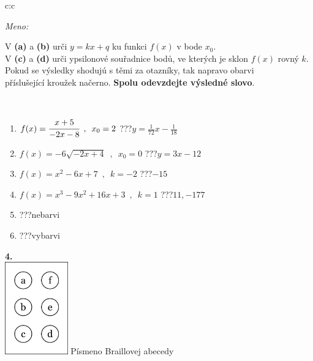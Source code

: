 \documentclass[10pt]{report}
\begin{document}
\begin{tabular}{c:c}
\begin{minipage}[c][104.5mm][t]{0.5\linewidth}
\begin{center}
\textit{Meno:}\phantom{xxxxxxxxxxxxxxxxxxxxxxxxxxxxxxxxxxxxxxxxxxxxxxxxxxxxxxxxxxxxxxxxx}\\[5mm]
\begin{minipage}{0.95\linewidth}
\begin{center}
V \textbf{(a)} a \textbf{(b)} urči  $y = kx + q$ ku funkci $f(x)$ v bode $x_0$.\\V \textbf{(c)} a \textbf{(d)} urči ypsilonové souřadnice bodů, ve kterých je sklon $f(x)$ rovný $k$.\\Pokud se výsledky shodujú s těmi za otazníky, tak napravo obarvi\\příslušející kroužek načerno. \textbf{Spolu odevzdejte výsledné slovo}.
\end{center}
\end{minipage}
\\[1mm]
\begin{minipage}{0.79\linewidth}
\begin{center}
\begin{varwidth}{\linewidth}
\begin{enumerate}
\small
\item $f(x)=\cfrac{x+5}{-2x-8}\enspace , \enspace x_0=2$\quad \dotfill\; ???\;\dotfill \quad $y = \frac{1}{72}x-\frac{1}{18}$
\item $f(x)=-6\sqrt{-2x+4}\enspace , \enspace x_0=0$\quad \dotfill\; ???\;\dotfill \quad $y = 3x-12$
\item $f(x)=x^2-6x+7\enspace , \enspace k=-2$\quad \dotfill\; ???\;\dotfill \quad $-15$
\item $f(x)=x^3-9x^2+16x+3\enspace , \enspace k=1$\quad \dotfill\; ???\;\dotfill \quad $11 , -177$
\item \quad \dotfill\; ???\;\dotfill \quad nebarvi
\item \quad \dotfill\; ???\;\dotfill \quad vybarvi
\end{enumerate}
\end{varwidth}
\end{center}
\end{minipage}
\begin{minipage}{0.20\linewidth}
\begin{center}
{\Huge\bfseries 4.} \\[2mm]
\includegraphics[height=40mm]{../images/braille.png}
{\small Písmeno Braillovej abecedy}
\end{center}
\end{minipage}
\end{center}
\end{minipage}
%
\end{tabular}
\end{document}
